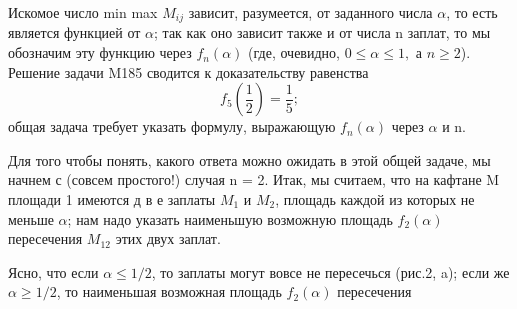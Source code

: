 \documentclass[main.tex]{subfiles}
\begin{document}
\begin{multicols}{2}
Искомое число min max $M_{ij}$ зависит, разумеется, от заданного числа $\alpha$, то есть является функцией от $\alpha$; так как оно зависит также и от числа n заплат, то мы обозначим эту функцию через $f_n(\alpha)$ (где, очевидно, $0 \leq \alpha \leq 1,$ а $n \geq 2$). Решение задачи M185 сводится к доказательству равенства
\[
f_5(\frac{1}{2}) = \frac{1}{5};
\]
общая задача требует указать формулу, выражающую $f_n(\alpha)$ через $\alpha$ и n.

Для того чтобы понять, какого ответа можно ожидать в этой общей задаче, мы начнем с (совсем простого!) случая n = 2. Итак, мы считаем, что на кафтане M площади 1 имеются д в е  заплаты $M_1$ и $M_2$, площадь каждой из которых не меньше $\alpha$; нам надо указать наименьшую возможную площадь $f_2(\alpha)$ пересечения $M_{12}$ этих двух заплат.

Ясно, что если $\alpha \leq 1/2$, то заплаты могут вовсе не пересечься (рис.2, a); если же $\alpha \geq 1/2$, то наименьшая возможная площадь $f_2(\alpha)$ пересечения


\end{multicols}
\end{document}
